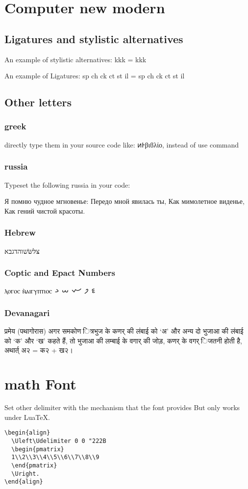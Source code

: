 \documentclass[
  class=article,
  lang=cn,
]{zlatex}
\begin{document}
\section{Computer new modern}
\subsection{Ligatures and stylistic alternatives}
An example of stylistic alternatives: kkk = {\ncmr kkk}

An example of Ligatures: sp ch ck ct st il = {\ncmr sp ch ck ct st il}

\subsection{Other letters}
\subsubsection{greek}
directly type them in your source code like: ͷͰβιϐλίο,  instead of use command

\subsubsection{russia}
Typeset the following russia in your code:

Я помню чудное мгновенье: Передо мной явилась ты, Как мимолетное виденье, Как гений чистой красоты.


\subsubsection{Hebrew}
צּלּשּׂשׁוהדגבא

\subsubsection{Coptic and Epact Numbers}
ⲗⲟⲅⲟⲥ ⲛ̀ⲁⲓⲅⲩⲡⲧⲓⲟⲥ 𐋡 𐋢 𐋣 𐋤 𐋥

\subsubsection{Devanagari}
{\deva प्रमेय (पथागोरास) अगर समकोण ित्रभुज के कणर् की लंबाई को ‘अ’ और
अन्य दो भुजाआ की लंबाई को ‘क’ और ‘ख’ कहते हैं, तो भुजाआ की लम्बाई के वगार् की जोड़,
कणर् के वगर् िजतनी होती है, अथार्त् अ२ = क२ + ख२।}


\section{math Font}
Set other delimiter with the mechanism that the font provides But only works under Lua\TeX{}.
\begin{verbatim}
\begin{align}
  \Uleft\Udelimiter 0 0 "222B
  \begin{pmatrix}
  1\\2\\3\\4\\5\\6\\7\\8\\9
  \end{pmatrix}
  \Uright.
\end{align}
\end{verbatim}
\end{document}
